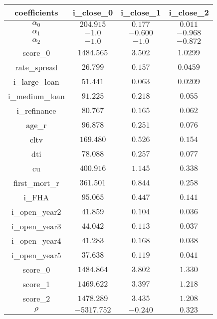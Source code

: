 \begin{tabular}{cccc}
\toprule
coefficients & i\_close\_0 &  i\_close\_1 & i\_close\_2 \\
\toprule
$\alpha_{0}$ & $204.915$ & $0.177$ & $0.011$\\
$\alpha_{1}$ & $-1.0$ & $-0.600$ & $-0.968$\\
$\alpha_{2}$ & $-1.0$ & $-1.0$ & $-0.872$\\
score\_0 & $1484.565$ & $3.502$ & $1.0299$\\
rate\_spread & $26.799$ & $0.157$ & $0.0459$\\
i\_large\_loan & $51.441$ & $0.063$ & $0.0209$\\
i\_medium\_loan & $91.225$ & $0.218$ & $0.055$\\
i\_refinance & $80.767$ & $0.165$ & $0.062$\\
age\_r & $96.878$ & $0.251$ & $0.076$\\
cltv & $169.480$ & $0.526$ & $0.154$\\
dti & $78.088$ & $0.257$ & $0.077$\\
cu & $400.916$ & $1.145$ & $0.338$\\
first\_mort\_r & $361.501$ & $0.844$ & $0.258$\\
i\_FHA & $95.065$ & $0.447$ & $0.141$\\
i\_open\_year2 & $41.859$ & $0.104$ & $0.036$\\
i\_open\_year3 & $44.042$ & $0.113$ & $0.037$\\
i\_open\_year4 & $41.283$ & $0.168$ & $0.038$\\
i\_open\_year5 & $37.638$ & $0.119$ & $0.041$\\
score\_0 & $1484.864$ & $3.802$ & $1.330$\\
score\_1 & $1469.622$ & $3.397$ & $1.218$\\
score\_2 & $1478.289$ & $3.435$ & $1.208$\\
$\rho$ & $-5317.752$ & $-0.240$ & $0.323$\\
\toprule
\end{tabular}
